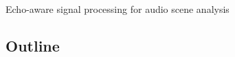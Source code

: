 \begin{frame}[t]{\alert{Echo-aware signal processing for audio scene analysis}}

\end{frame}

\subsection{Outline}

